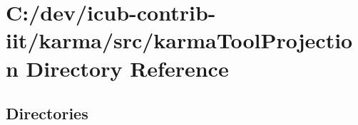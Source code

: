 \section{C\+:/dev/icub-\/contrib-\/iit/karma/src/karma\+Tool\+Projection Directory Reference}
\label{dir_41f00478989b00c299e09b5f630aa3f5}
\subsection*{Directories}
\begin{DoxyCompactItemize}
\end{DoxyCompactItemize}
